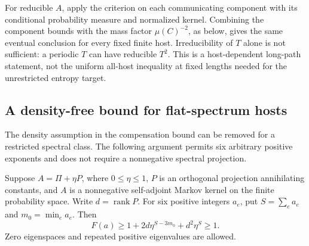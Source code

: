 For reducible $A$, apply the criterion on each communicating component
with its conditional probability measure and normalized kernel.  Combining
the component bounds with the mass factor $\mu(C)^{-2}$, as below, gives
the same eventual conclusion for every fixed finite host.  Irreducibility
of $T$ alone is not sufficient: a periodic $T$ can have reducible $T^2$.
This is a host-dependent long-path statement, not the uniform all-host
inequality at fixed lengths needed for the unrestricted entropy target.

\subsection{A density-free bound for flat-spectrum hosts}

The density assumption in the compensation bound can be removed for a
restricted spectral class.  The following argument permits six arbitrary
positive exponents and does not require a nonnegative spectral projection.

\begin{proposition}
Suppose $A=\Pi+\eta P$, where $0\leq\eta\leq1$, $P$ is an orthogonal
projection annihilating constants, and $A$ is a nonnegative self-adjoint
Markov kernel on the finite probability space.  Write $d=\operatorname{rank}P$.
For six positive integers $a_e$, put $S=\sum_ea_e$ and $m_0=\min_ea_e$.
Then
\begin{equation}
 F(a)\geq1+2d\eta^{S-3m_0}+d^2\eta^S\geq1.
 \label{eq:flat-spectrum-rank3-bound}
\end{equation}
Zero eigenspaces and repeated positive eigenvalues are allowed.
\end{proposition}


